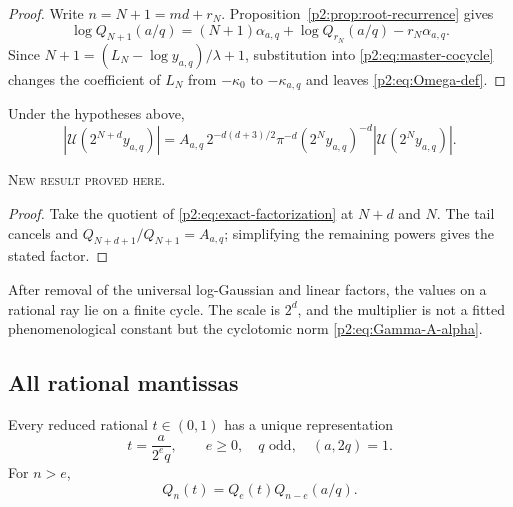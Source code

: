\documentclass[11pt,oneside]{article}
\theoremstyle{definition}
\theoremstyle{remark}
\newcommand{\newresult}{\textcolor{newgreen}{\textsc{New result proved here.}}}
\begin{document}
\begin{proof}
Write $n=N+1=md+r_N$. Proposition~\ref{p2:prop:root-recurrence} gives
\[
 \log Q_{N+1}(a/q)
 =(N+1)\alpha_{a,q}+
 \log Q_{r_N}(a/q)-r_N\alpha_{a,q}.
\]
Since $N+1=(L_N-\log y_{a,q})/\lambda+1$, substitution into
\eqref{p2:eq:master-cocycle} changes the coefficient of $L_N$ from $-\kappa_0$ to
$-\kappa_{a,q}$ and leaves \eqref{p2:eq:Omega-def}.
\end{proof}

\begin{corollary}\label{p2:cor:d-step-ray}
Under the hypotheses above,
\begin{equation}
 \boxed{
 |\mathscr U(2^{N+d}y_{a,q})|
 =A_{a,q}\,2^{-d(d+3)/2}\pi^{-d}(2^Ny_{a,q})^{-d}
 |\mathscr U(2^Ny_{a,q})|.}
 \label{p2:eq:d-step-ray}
\end{equation}

\smallskip\noindent\newresult
\end{corollary}

\begin{proof}
Take the quotient of \eqref{p2:eq:exact-factorization} at $N+d$ and $N$. The tail
cancels and $Q_{N+d+1}/Q_{N+1}=A_{a,q}$; simplifying the remaining powers gives
the stated factor.
\end{proof}

\begin{remark}
After removal of the universal log-Gaussian and linear factors, the values on a
rational ray lie on a finite cycle. The scale is $2^d$, and the multiplier is not a
fitted phenomenological constant but the cyclotomic norm \eqref{p2:eq:Gamma-A-alpha}.
\end{remark}

\subsection{All rational mantissas}

Every reduced rational $t\in(0,1)$ has a unique representation
\begin{equation}
 t=\frac{a}{2^eq},\qquad e\ge0,\quad q\text{ odd},\quad(a,2q)=1.
 \label{p2:eq:even-denominator}
\end{equation}
For $n>e$,
\begin{equation}
 Q_n(t)=Q_e(t)Q_{n-e}(a/q).
 \label{p2:eq:preperiod-Q}
\end{equation}
\end{document}
